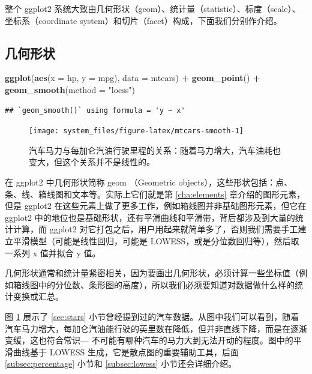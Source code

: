 \documentclass[
  b5paper,
  UTF8,twoside]{book}
\newenvironment{Shaded}{\begin{snugshade}}{\end{snugshade}}
\newcommand{\AttributeTok}[1]{\textcolor[rgb]{0.13,0.29,0.53}{#1}}
\newcommand{\FunctionTok}[1]{\textcolor[rgb]{0.13,0.29,0.53}{\textbf{#1}}}
\newcommand{\NormalTok}[1]{#1}
\newcommand{\SpecialCharTok}[1]{\textcolor[rgb]{0.81,0.36,0.00}{\textbf{#1}}}
\newcommand{\StringTok}[1]{\textcolor[rgb]{0.31,0.60,0.02}{#1}}
\begin{document}
整个 ggplot2 系统大致由几何形状（geom）、统计量（statistic）、标度（scale）、坐标系（coordinate system）和切片（facet）构成，下面我们分别作介绍。

\subsection{几何形状}\label{ux51e0ux4f55ux5f62ux72b6}

\begin{Shaded}
\begin{Highlighting}[]
\FunctionTok{ggplot}\NormalTok{(}\FunctionTok{aes}\NormalTok{(}\AttributeTok{x =}\NormalTok{ hp, }\AttributeTok{y =}\NormalTok{ mpg), }\AttributeTok{data =}\NormalTok{ mtcars) }\SpecialCharTok{+}
  \FunctionTok{geom\_point}\NormalTok{() }\SpecialCharTok{+}
  \FunctionTok{geom\_smooth}\NormalTok{(}\AttributeTok{method =} \StringTok{"loess"}\NormalTok{)}
\end{Highlighting}
\end{Shaded}

\begin{verbatim}
## `geom_smooth()` using formula = 'y ~ x'
\end{verbatim}

\begin{figure}

{\centering \texttt{[image: system\_files/figure-latex/mtcars-smooth-1]} 

}

\caption[汽车马力与每加仑汽油行驶里程的关系]{汽车马力与每加仑汽油行驶里程的关系：随着马力增大，汽车油耗也变大，但这个关系并不是线性的。}\label{fig:mtcars-smooth}
\end{figure}





在 ggplot2 中几何形状简称 geom （Geometric objects），这些形状包括：点、条、线、箱线图和文本等。实际上它们就是第 \ref{cha:elements} 章介绍的图形元素，但是 ggplot2 在这些元素上做了更多工作，例如箱线图并非基础图形元素，但它在 ggplot2 中的地位也是基础形状，还有平滑曲线和平滑带，背后都涉及到大量的统计计算，而 ggplot2 对它打包之后，用户用起来就简单多了，否则我们需要手工建立平滑模型（可能是线性回归，可能是 LOWESS，或是分位数回归等），然后取一系列 x 值并拟合 y 值。

几何形状通常和统计量紧密相关，因为要画出几何形状，必须计算一些坐标值（例如箱线图中的分位数、条形图的高度），所以我们必须要知道对数据做什么样的统计变换或汇总。

图 \ref{fig:mtcars-smooth} 展示了 \ref{sec:stars} 小节曾经提到过的汽车数据。从图中我们可以看到，随着汽车马力增大，每加仑汽油能行驶的英里数在降低，但并非直线下降，而是在逐渐变缓，这也符合常识--- 不可能有哪种汽车的马力大到无法开动的程度。图中的平滑曲线基于 LOWESS 生成，它是散点图的重要辅助工具，后面 \ref{subsec:percentage} 小节和 \ref{subsec:lowess} 小节还会详细介绍。
\end{document}
